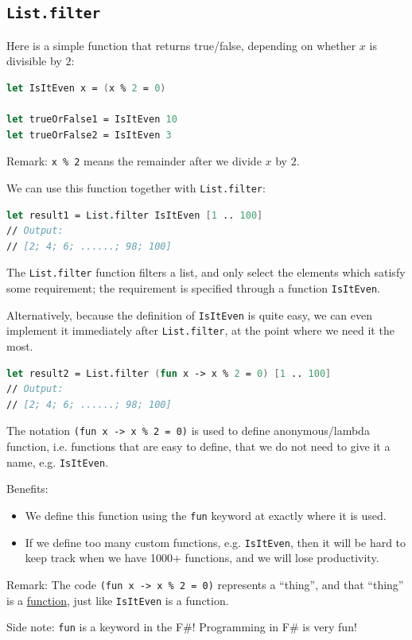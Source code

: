 \documentclass[12pt]{article}
\begin{document}
\pagebreak

\subsection{\texttt{List.filter}}
Here is a simple function that returns true/false, depending on whether $x$ is divisible by $2$:
\begin{lstlisting}[language=FSharp]
let IsItEven x = (x % 2 = 0)

let trueOrFalse1 = IsItEven 10
let trueOrFalse2 = IsItEven 3
\end{lstlisting}
Remark: \texttt{x \% 2} means the remainder after we divide $x$ by $2$.

We can use this function together with \texttt{List.filter}:
\begin{lstlisting}[language=FSharp]
let result1 = List.filter IsItEven [1 .. 100]
// Output:
// [2; 4; 6; ......; 98; 100]
\end{lstlisting}
The \texttt{List.filter} function filters a list, and only select the elements which satisfy some requirement; the requirement is specified through a function \texttt{IsItEven}.

Alternatively, because the definition of \texttt{IsItEven} is quite easy, we can even implement it immediately after \texttt{List.filter}, at the point where we need it the most.
\begin{lstlisting}[language=FSharp]
let result2 = List.filter (fun x -> x % 2 = 0) [1 .. 100]
// Output:
// [2; 4; 6; ......; 98; 100]
\end{lstlisting}
The notation \texttt{(fun x -> x \% 2 = 0)} is used to define anonymous/lambda function, i.e. functions that are easy to define, that we do not need to give it a name, e.g. \texttt{IsItEven}.

Benefits:
\begin{itemize}
\item We define this function using the \texttt{fun} keyword at exactly where it is used.
\item If we define too many custom functions, e.g. \texttt{IsItEven}, then it will be hard to keep track when we have 1000+ functions, and we will lose productivity.
\end{itemize}
Remark: The code \texttt{(fun x -> x \% 2 = 0)} represents a ``thing'', and that ``thing'' is a \underline{function}, just like \texttt{IsItEven} is a function.

Side note: \texttt{fun} is a keyword in the F\#! Programming in F\# is very fun!
\end{document}
